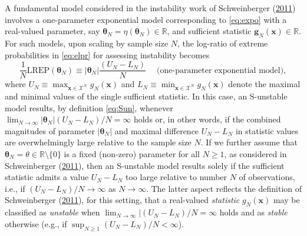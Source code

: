 \documentclass[]{article}
\theoremstyle{definition}
\newcommand{\REP}{\mathrm{LREP}}
\begin{document}
A fundamental model considered in the instability work of Schweinberger
(\protect\hyperlink{ref-schweinberger2011instability}{2011}) involves a
one-parameter exponential model corresponding to \eqref{eq:expo} with a
real-valued parameter, say
\(\boldsymbol \theta_N = \eta(\boldsymbol \theta_N)\in \mathbb{R}\), and
sufficient statistic \(\boldsymbol g_N(\boldsymbol x)\in \mathbb{R}\).
For such models, upon scaling by sample size \(N\), the log-ratio of
extreme probabilities in \eqref{eq:elpr} for assessing instability becomes
\begin{equation}
\label{eq:UL}
\frac{1}{N}\REP(\boldsymbol \theta_N ) \equiv   |\boldsymbol \theta_N| \frac{(U_N-L_N)}{N} \;\quad \text{(one-parameter exponential model)},
\end{equation}
where
\(U_N \equiv \max_{\boldsymbol x\in\mathcal{X}^N}g_N(\boldsymbol x)\)
and
\(L_N \equiv \min_{\boldsymbol x\in\mathcal{X}^N}g_N(\boldsymbol x)\)
denote the maximal and minimal values of the single sufficient
statistic. In this case, an S-unstable model results, by definition
\eqref{eq:Sun}, whenever
\(\lim_{N\to \infty} |\boldsymbol \theta_N| (U_N-L_N)/N= \infty\) holds
or, in other words, if the combined magnitudes of parameter
\(|\boldsymbol \theta_N|\) and maximal difference \(U_N-L_N\) in
statistic values are overwhelmingly large relative to the sample size
\(N\). If we further assume that
\(\boldsymbol \theta_N =\theta\in\mathbb{R}\setminus \{0\}\) is a fixed
(non-zero) parameter for all \(N \geq 1\), as considered in
Schweinberger
(\protect\hyperlink{ref-schweinberger2011instability}{2011}), then an
S-unstable model results solely if the sufficient statistic admits a
value \(U_N-L_N\) too large relative to number \(N\) of observations,
i.e., if \((U_N-L_N)/N\to \infty\) as \(N\to \infty\). The latter aspect
reflects the definition of Schweinberger
(\protect\hyperlink{ref-schweinberger2011instability}{2011}), for this
setting, that a real-valued \emph{statistic} \(g_N(\boldsymbol x)\) may
be classified as \emph{unstable} when
\(\lim_{N\to \infty}|(U_N-L_N)/N=\infty\) holds and as \emph{stable}
otherwise (e.g., if \(\sup_{N \geq 1}(U_N-L_N)/N<\infty\)).
\end{document}
